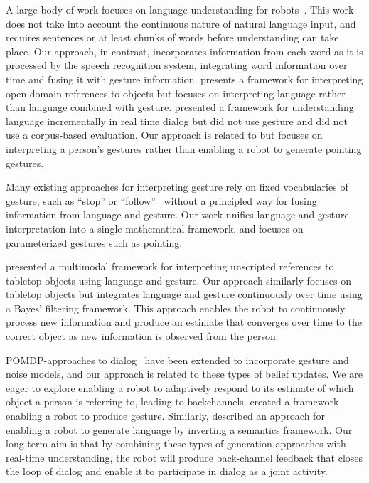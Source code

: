 \documentclass[graybox]{svmult}
\begin{document}
A large body of work focuses on language understanding for
robots~\citep{macmahon06, dzifcak09, kollar10, matuszek12}.  This work
does not take into account the continuous nature of natural language
input, and requires sentences or at least chunks of words before
understanding can take place.  Our approach, in contrast, incorporates
information from each word as it is processed by the speech
recognition system, integrating word information over time and fusing
it with gesture information.  \citet{guadarrama14} presents a
framework for interpreting open-domain references to objects but
focuses on interpreting language rather than language combined with
gesture.  \citet{cantrell10} presented a framework for understanding
language incrementally in real time dialog but did not use gesture and
did not use a corpus-based evaluation.  Our approach is related to
\citet{holladay14} but focuses on interpreting a person's gestures
rather than enabling a robot to generate pointing gestures.

Many existing approaches for interpreting gesture rely on fixed
vocabularies of gesture, such as ``stop'' or
``follow''~\citep{waldherr00, marge11} without a principled way for
fusing information from language and gesture.  Our work unifies
language and gesture interpretation into a single mathematical
framework, and focuses on parameterized gestures such as pointing.

\citet{matuszek14} presented a multimodal framework for interpreting
unscripted references to tabletop objects using language and gesture.
Our approach similarly focuses on tabletop objects but integrates
language and gesture continuously over time using a Bayes' filtering
framework.  This approach enables the robot to continuously process
new information and produce an estimate that converges over time to
the correct object as new information is observed from the person.

POMDP-approaches to dialog~\citep{young13, young10} have been extended
to incorporate gesture and noise models, and our approach is related
to these types of belief updates.  We are eager to explore enabling a
robot to adaptively respond to its estimate of which object a person
is referring to, leading to backchannels.  \citet{dragan13} created a
framework enabling a robot to produce gesture.  Similarly,
\citet{tellex14} described an approach for enabling a robot to
generate language by inverting a semantics framework.  Our long-term
aim is that by combining these types of generation approaches with
real-time understanding, the robot will produce back-channel feedback
that closes the loop of dialog and enable it to participate in dialog
as a joint activity.
\end{document}
